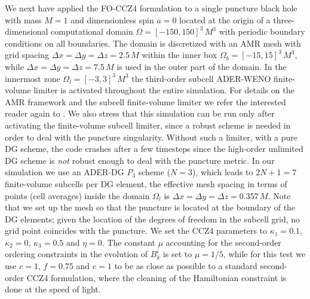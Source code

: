 We next have applied the FO-CCZ4 formulation to a single puncture black
hole \cite{Brandt97b} with mass $M=1$ and dimensionless spin $a=0$
located at the origin of a three-dimensional computational domain $\Omega
= [-150,150]^3 \, M^3$ with periodic boundary conditions on all
boundaries. The
domain is discretized with an AMR mesh with grid spacing $\Delta x =
\Delta y = \Delta z = 2.5\,M$ within the inner box $\Omega_b = [-15,15]^3
\, M^3$, while $\Delta x = \Delta y = \Delta z = 7.5\,M$ is used in the
outer part of the domain. In the innermost zone $\Omega_l = [-3,3]^3 \,
M^3$ the third-order subcell ADER-WENO finite-volume limiter is activated
throughout the entire simulation. For details on the AMR framework and
the subcell finite-volume limiter we refer the interested reader again to
\cite{Dumbser2014,Zanotti2015c,Zanotti2015b}. We also stress that this
simulation can be run only after activating the finite-volume subcell
limiter, since a robust scheme is needed in order to deal with the
puncture singularity. Without such a limiter, \ie with a pure DG scheme,
the code crashes after a few timesteps since the high-order unlimited DG
scheme is \textit{not} robust enough to deal with the puncture metric. In
our simulation we use an ADER-DG $P_3$ scheme ($N=3$), which leads to
$2N+1 = 7$ finite-volume subcells per DG element, \ie the effective mesh
spacing in terms of points (cell averages) inside the domain $\Omega_l$
is $\Delta x = \Delta y = \Delta z = 0.357\,M$.  Note that we set up the
mesh so that the puncture is located at the boundary of the DG elements;
given the location of the degrees of freedom in the subcell grid, no grid 
point coincides with the puncture.
We set the CCZ4 parameters to $\kappa_1 = 0.1$, $\kappa_2=0$, $\kappa_3 =
0.5$ and $\eta=0$. The constant $\mu$ accounting for the second-order
ordering constraints in the evolution of $B^i_k$ is set to $\mu=1/5$,
while for this test we use $c=1$, $f=0.75$ and $e=1$ to be as close as 
possible to a standard second-order CCZ4 formulation, where the cleaning 
of the Hamiltonian constraint is done at the speed of light.

